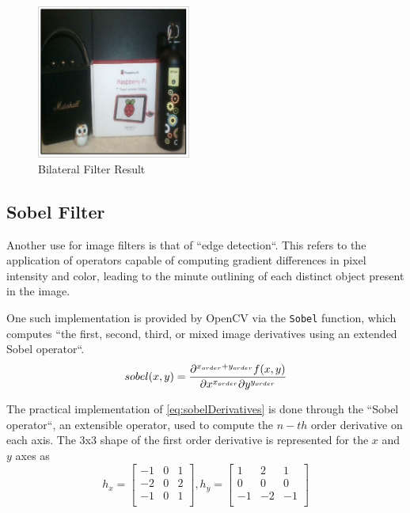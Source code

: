 \begin{figure}[H]
	\includegraphics[width=0.45\textwidth, height=0.45\textwidth]{resources/Bilateral_2.png}
	\caption{Bilateral Filter Result}
\end{figure}

\subsection{Sobel Filter}

Another use for image filters is that of ``edge detection``. This refers to the application of operators
capable  of computing gradient differences in pixel intensity and color, leading to the minute outlining of
each distinct object present in the image.

One such implementation is provided by OpenCV via the \verb|Sobel| function, which computes ``the first,
second, third, or mixed image derivatives using an extended Sobel operator``. \cite{opencvImproc}
\begin{equation}
	\label{eq:sobelDerivatives}
	sobel(x, y) =
	{{\partial^{x_{order}+y_{order}}f(x, y)}\over{\partial x^{x_{order}} \partial y^{y_{order}}}}
\end{equation}

The practical implementation of \cref{eq:sobelDerivatives} is done through the ``Sobel operator``, an
extensible operator, used to compute the \(n-th\) order derivative on each axis. The 3x3 shape of the
first order derivative is represented for the \(x\) and \(y\) axes \cite{ispBook} as
\begin{equation}
	\label{eq:sobelOperators}
	h_x =
	\begin{bmatrix}
		-1 & 0 & 1 \\
		-2 & 0 & 2 \\
		-1 & 0 & 1 \\
	\end{bmatrix}
	,
	h_y =
	\begin{bmatrix}
		1  & 2  & 1  \\
		0  & 0  & 0  \\
		-1 & -2 & -1 \\
	\end{bmatrix}
\end{equation}

